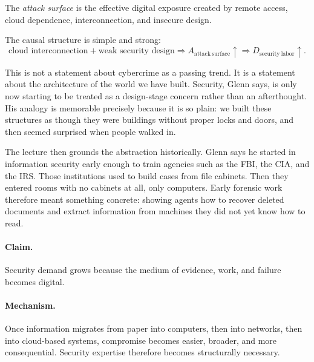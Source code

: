 \begin{definition}
The \emph{attack surface} is the effective digital exposure created by remote access, cloud dependence, interconnection, and insecure design.
\end{definition}

The causal structure is simple and strong:
\begin{equation}
\text{cloud interconnection} + \text{weak security design}
\Longrightarrow A_{\mathrm{attack\ surface}}\uparrow
\Longrightarrow D_{\mathrm{security\ labor}}\uparrow.
\end{equation}

This is not a statement about cybercrime as a passing trend. It is a statement about the architecture of the world we have built. Security, Glenn says, is only now starting to be treated as a design-stage concern rather than an afterthought. His analogy is memorable precisely because it is so plain: we built these structures as though they were buildings without proper locks and doors, and then seemed surprised when people walked in.

The lecture then grounds the abstraction historically. Glenn says he started in information security early enough to train agencies such as the FBI, the CIA, and the IRS. Those institutions used to build cases from file cabinets. Then they entered rooms with no cabinets at all, only computers. Early forensic work therefore meant something concrete: showing agents how to recover deleted documents and extract information from machines they did not yet know how to read.

\paragraph{Claim.} Security demand grows because the medium of evidence, work, and failure becomes digital.

\paragraph{Mechanism.} Once information migrates from paper into computers, then into networks, then into cloud-based systems, compromise becomes easier, broader, and more consequential. Security expertise therefore becomes structurally necessary.

